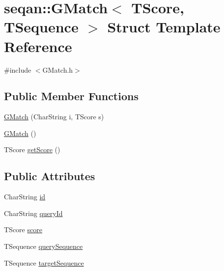 \hypertarget{structseqan_1_1_g_match}{\section{seqan\-:\-:G\-Match$<$ T\-Score, T\-Sequence $>$ Struct Template Reference}
\label{structseqan_1_1_g_match}
}


{\ttfamily \#include $<$G\-Match.\-h$>$}

\subsection*{Public Member Functions}
\begin{DoxyCompactItemize}
\item 
\hyperlink{structseqan_1_1_g_match_a2d9ca43c6774fc0a6ecce18a1616cee5}{G\-Match} (Char\-String i, T\-Score s)
\item 
\hyperlink{structseqan_1_1_g_match_a97931c51078da8a996ca32e634b4d10c}{G\-Match} ()
\item 
T\-Score \hyperlink{structseqan_1_1_g_match_abb18449ea53a23e2d2b00d0ca60e2ad5}{get\-Score} ()
\end{DoxyCompactItemize}
\subsection*{Public Attributes}
\begin{DoxyCompactItemize}
\item 
Char\-String \hyperlink{structseqan_1_1_g_match_ae4eac560a806ad0771f1aea4106ffd0d}{id}
\item 
Char\-String \hyperlink{structseqan_1_1_g_match_a49524158acebda7f2aa2711fa675fe5a}{query\-Id}
\item 
T\-Score \hyperlink{structseqan_1_1_g_match_a167782c90ebf893b4ed14dec10751e2d}{score}
\item 
T\-Sequence \hyperlink{structseqan_1_1_g_match_a5bf1edefeece4584350a5d8b51bf5931}{query\-Sequence}
\item 
T\-Sequence \hyperlink{structseqan_1_1_g_match_a13f2c3906e402472217935df02c0c134}{target\-Sequence}
\end{DoxyCompactItemize}


